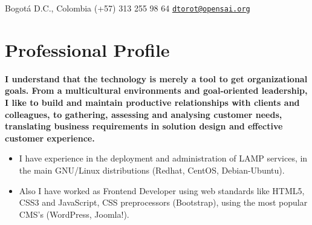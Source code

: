 \documentclass[overlapped,line,final]{res}
\begin{document}

\begin{resume}


	\begin{minipage}{0.5\linewidth}
    		Bogotá D.C., Colombia \newline
    		(+57) 313 255 98 64 \newline
		{\tt \href{mailto:dtorot@opensai.org}{dtorot@opensai.org}}
	\end{minipage}


\vspace{0.5cm}
\section{\sc Professional Profile}
\vspace{0.5cm}

	\textbf {I understand that the technology is merely a tool to get organizational goals. From a multicultural environments and goal-oriented leadership, I like to build and maintain productive relationships with clients and colleagues, to gathering, assessing and analysing customer needs, translating business requirements in solution design and effective customer experience.}

\vspace{2mm}
\begin{itemize} 
    \item I have experience in the deployment and administration of LAMP services, in the main GNU/Linux distributions (Redhat, CentOS, Debian-Ubuntu). 
    \item Also I have worked as Frontend Developer using web standards like HTML5, CSS3 and JavaScript, CSS preprocessors (Bootstrap), using the most popular CMS's (WordPress, Joomla!).


\end{itemize}
\end{resume}
\end{document}
